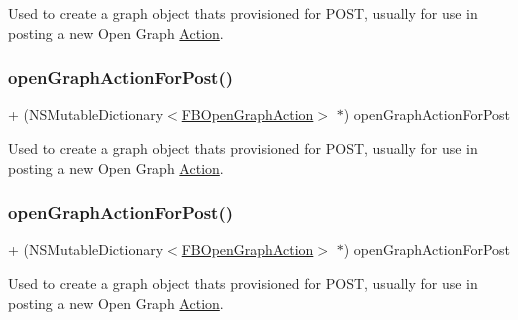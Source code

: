 Used to create a graph object that\textquotesingle{}s provisioned for P\+O\+ST, usually for use in posting a new Open Graph \hyperlink{classAction}{Action}. \mbox{\label{interfaceFBGraphObject_a88f02cdbd7bbafe3c836b9bcd731860d}} 
\subsubsection{\texorpdfstring{open\+Graph\+Action\+For\+Post()}{openGraphActionForPost()}\hspace{0.1cm}{\footnotesize\ttfamily [3/5]}}
{\footnotesize\ttfamily + (N\+S\+Mutable\+Dictionary$<$\hyperlink{protocolFBOpenGraphAction-p}{F\+B\+Open\+Graph\+Action}$>$ $\ast$) open\+Graph\+Action\+For\+Post \begin{DoxyParamCaption}{ }\end{DoxyParamCaption}}

Used to create a graph object that\textquotesingle{}s provisioned for P\+O\+ST, usually for use in posting a new Open Graph \hyperlink{classAction}{Action}. \mbox{\label{interfaceFBGraphObject_a88f02cdbd7bbafe3c836b9bcd731860d}} 
\subsubsection{\texorpdfstring{open\+Graph\+Action\+For\+Post()}{openGraphActionForPost()}\hspace{0.1cm}{\footnotesize\ttfamily [4/5]}}
{\footnotesize\ttfamily + (N\+S\+Mutable\+Dictionary$<$\hyperlink{protocolFBOpenGraphAction-p}{F\+B\+Open\+Graph\+Action}$>$ $\ast$) open\+Graph\+Action\+For\+Post \begin{DoxyParamCaption}{ }\end{DoxyParamCaption}}

Used to create a graph object that\textquotesingle{}s provisioned for P\+O\+ST, usually for use in posting a new Open Graph \hyperlink{classAction}{Action}. \mbox{\label{interfaceFBGraphObject_a88f02cdbd7bbafe3c836b9bcd731860d}} 
